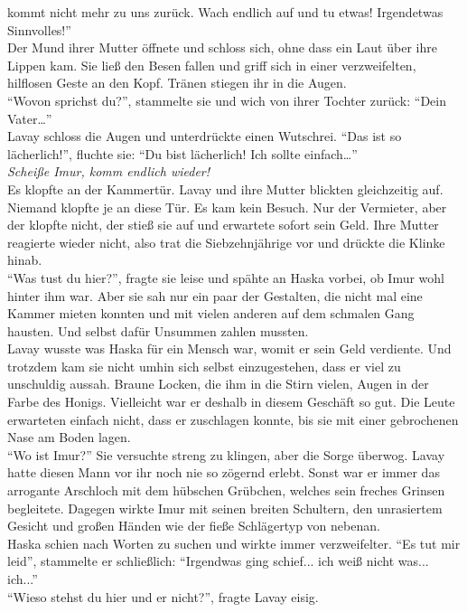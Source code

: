 kommt nicht mehr zu uns zurück. Wach endlich auf und tu etwas! Irgendetwas Sinnvolles!''\\
Der Mund ihrer Mutter öffnete und schloss sich, ohne dass ein Laut über ihre Lippen kam. Sie ließ 
den Besen fallen und griff sich in einer verzweifelten, hilflosen Geste an den Kopf. Tränen stiegen 
ihr in die Augen. \\
``Wovon sprichst du?'', stammelte sie und wich von ihrer Tochter zurück: ``Dein Vater…''\\
Lavay schloss die Augen und unterdrückte einen Wutschrei. ``Das ist so lächerlich!'', fluchte sie: 
``Du bist lächerlich! Ich sollte einfach…''\\
\textit{Scheiße Imur, komm endlich wieder!}\\
Es klopfte an der Kammertür. Lavay und ihre Mutter blickten gleichzeitig auf. Niemand klopfte je an 
diese Tür. Es kam kein Besuch. Nur der Vermieter, aber der klopfte nicht, der stieß sie auf und 
erwartete sofort sein Geld. Ihre Mutter reagierte wieder nicht, also trat die Siebzehnjährige vor 
und drückte die Klinke hinab. \\
``Was tust du hier?'', fragte sie leise und spähte an Haska vorbei, ob Imur wohl hinter ihm war. 
Aber sie sah nur ein paar der Gestalten, die nicht mal eine Kammer mieten konnten und mit vielen 
anderen auf dem schmalen Gang hausten. Und selbst dafür Unsummen zahlen mussten. \\
Lavay wusste was Haska für ein Mensch war, womit er sein Geld verdiente. Und trotzdem kam sie nicht 
umhin sich selbst einzugestehen, dass er viel zu unschuldig aussah. Braune Locken, die ihm in die 
Stirn vielen, Augen in der Farbe des Honigs. Vielleicht war er deshalb in diesem Geschäft so gut. 
Die Leute erwarteten einfach nicht, dass er zuschlagen konnte, bis sie mit einer gebrochenen Nase 
am Boden lagen. \\
``Wo ist Imur?'' Sie versuchte streng zu klingen, aber die Sorge überwog. Lavay hatte diesen Mann 
vor ihr noch nie so zögernd erlebt. Sonst war er immer das arrogante Arschloch mit dem hübschen 
Grübchen, welches sein freches Grinsen begleitete. Dagegen wirkte Imur mit seinen breiten 
Schultern, den unrasiertem Gesicht und großen Händen wie der fieße Schlägertyp von nebenan. \\
Haska schien nach Worten zu suchen und wirkte immer verzweifelter. ``Es tut mir leid'', stammelte 
er schließlich: ``Irgendwas ging schief... ich weiß nicht was... ich...''\\
``Wieso stehst du hier und er nicht?'', fragte Lavay eisig.\\
